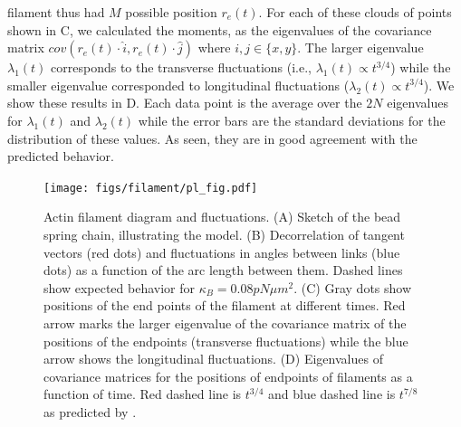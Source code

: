 \documentclass[12pt]{article}
\begin{document}
filament thus had $M$ possible position $r_e(t)$. For each of these clouds of points
shown in C, we calculated the moments, as the eigenvalues of 
the covariance matrix $cov(r_e(t)\cdot \hat{i},r_e(t)\cdot \hat{j})$ where
$i,j\in\{x,y\}$.
The larger eigenvalue $\lambda_1(t)$ corresponds to the transverse fluctuations
(i.e., $\lambda_1(t)\propto t^{3/4}$) while the smaller eigenvalue corresponded to 
longitudinal fluctuations ($\lambda_2(t)\propto t^{3/4}$). We show these results
in D. Each data point is the average over the $2N$ eigenvalues
for $\lambda_1(t)$ and $\lambda_2(t)$ while the error bars are the standard deviations for the
distribution of these values. As seen, they are in good agreement with the predicted behavior. 
\begin{figure}[H] 
  \centering
  \texttt{[image: figs/filament/pl\_fig.pdf]}
  \caption{\label{fig:filament}
  Actin filament diagram and fluctuations.
  (A) Sketch of the bead spring chain, illustrating the model.
  (B) Decorrelation of tangent vectors (red dots) and fluctuations in angles between links (blue dots) 
  as a function of the arc length between them. Dashed lines show expected behavior 
  for $\kappa_B=0.08 pN\mu m^2$.
  (C) Gray dots show positions of the end points of the filament at different times.
  Red arrow marks the larger eigenvalue of the covariance matrix of the positions
  of the endpoints (transverse fluctuations) while the blue arrow shows the longitudinal
  fluctuations. 
  (D) Eigenvalues of covariance matrices for the positions of endpoints of filaments as a function of time.  
  Red dashed line is $t^{3/4}$ and blue dashed line is $t^{7/8}$ as predicted by \cite{everaers1999}. 
}
\end{figure} 
\end{document}
